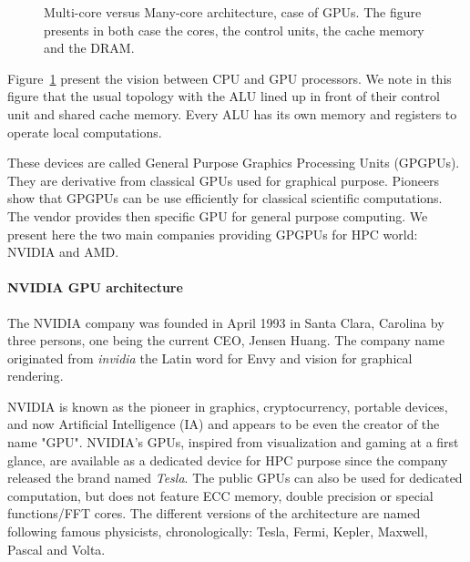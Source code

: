 \begin{figure}
\begin{center}

\end{center}
\caption[Multi-core versus Many-core architectures]{Multi-core versus Many-core architecture, case of GPUs. The figure presents in both case the cores, the control units, the cache memory and the DRAM.}
\label{fig:2_HARD:gpu}
\end{figure}

Figure~\ref{fig:2_HARD:gpu} present the vision between CPU and GPU processors. 
We note in this figure that the usual topology with the ALU lined up in front of their control unit and shared cache memory. 
Every ALU has its own memory and registers to operate local computations. 

These devices are called General Purpose Graphics Processing Units (GPGPUs). 
They are derivative from classical GPUs used for graphical purpose.
Pioneers show that GPGPUs can be use efficiently for classical scientific computations.
The vendor provides then specific GPU for general purpose computing.  
We present here the two main companies providing GPGPUs for HPC world: NVIDIA and AMD.

\paragraph{NVIDIA GPU architecture}
The NVIDIA company was founded in April 1993 in Santa Clara, Carolina by three persons, one being the current CEO, Jensen Huang.
The company name originated from \textit{invidia} the Latin word for Envy and vision for graphical rendering. 

NVIDIA is known as the pioneer in graphics, cryptocurrency, portable devices, and now Artificial Intelligence (IA) and appears to be even the creator of the name "GPU".
NVIDIA's GPUs, inspired from visualization and gaming at a first glance, are available as a dedicated device for HPC purpose since the company released the brand named \textit{Tesla}. 
The public GPUs can also be used for dedicated computation, but does not feature ECC memory, double precision or special functions/FFT cores. 
The different versions of the architecture are named following famous physicists, chronologically: Tesla, Fermi, Kepler, Maxwell, Pascal and Volta.

